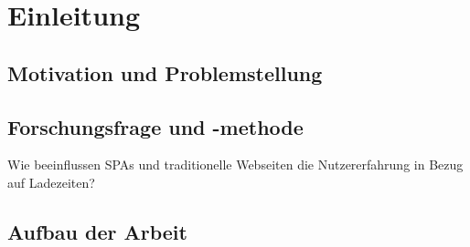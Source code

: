 

\section{Einleitung}

\subsection{Motivation und Problemstellung}
\subsection{Forschungsfrage und -methode}
Wie beeinflussen SPAs und traditionelle Webseiten die Nutzererfahrung in Bezug auf Ladezeiten?
\subsection{Aufbau der Arbeit}